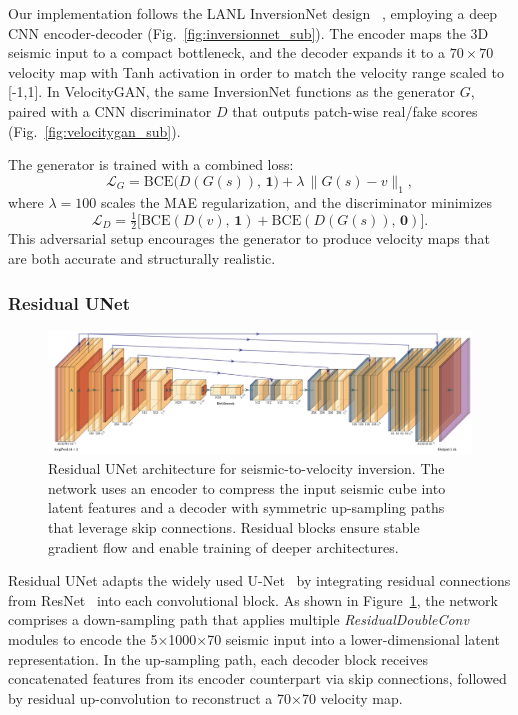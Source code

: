 \documentclass{article}
\begin{document}
  Our implementation follows the LANL InversionNet design ~\cite{inversionnet, velocitygan}, employing a deep CNN encoder-decoder (Fig.~\ref{fig:inversionnet_sub}). The encoder maps the 3D seismic input to a compact bottleneck, and the decoder expands it to a $70\times70$ velocity map with Tanh activation in order to match the velocity range scaled to [-1,1]. In VelocityGAN, the same InversionNet functions as the generator $G$, paired with a CNN discriminator $D$ that outputs patch-wise real/fake scores (Fig.~\ref{fig:velocitygan_sub}).
  
  The generator is trained with a combined loss:
  \[
  \mathcal{L}_G = \mathrm{BCE}\bigl(D(G(s)),\,\mathbf{1}\bigr) + \lambda\,\lVert G(s) - v\rVert_1,
  \]
  where $\lambda = 100$ scales the MAE regularization, and the discriminator minimizes
  \[
  \mathcal{L}_D = \tfrac{1}{2}\bigl[\mathrm{BCE}(D(v),\,\mathbf{1}) + \mathrm{BCE}(D(G(s)),\,\mathbf{0})\bigr].
  \]
  This adversarial setup encourages the generator to produce velocity maps that are both accurate and structurally realistic.  



\subsubsection{Residual UNet}

\begin{figure}
    \centering
    \includegraphics[width=0.8\linewidth]{figures/ResidualUNet.png}
    \caption{Residual UNet architecture for seismic-to-velocity inversion. The network uses an encoder to compress the input seismic cube into latent features and a decoder with symmetric up-sampling paths that leverage skip connections. Residual blocks ensure stable gradient flow and enable training of deeper architectures.}
    \label{fig:residual_unet}
\end{figure}

Residual UNet adapts the widely used U-Net~\cite{ronneberger2015u} by integrating residual connections from ResNet~\cite{he2016deep} into each convolutional block. As shown in Figure~\ref{fig:residual_unet}, the network comprises a down-sampling path that applies multiple \emph{ResidualDoubleConv} modules to encode the 5×1000×70 seismic input into a lower-dimensional latent representation. In the up-sampling path, each decoder block receives concatenated features from its encoder counterpart via skip connections, followed by residual up-convolution to reconstruct a 70×70 velocity map.
\end{document}
